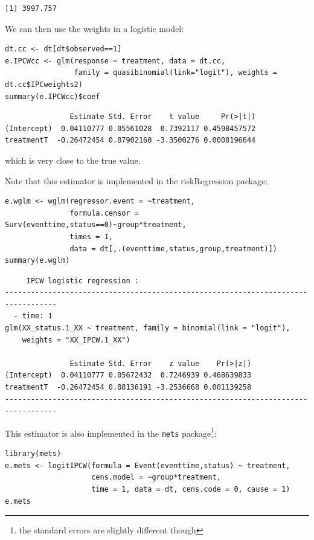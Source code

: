 \documentclass[12pt]{article}
\begin{document}
\begin{verbatim}
[1] 3997.757
\end{verbatim}


We can then use the weights in a logistic model:
\lstset{language=r,label= ,caption= ,captionpos=b,numbers=none}
\begin{lstlisting}
dt.cc <- dt[dt$observed==1]
e.IPCWcc <- glm(response ~ treatment, data = dt.cc,
                family = quasibinomial(link="logit"), weights = dt.cc$IPCweights2)
summary(e.IPCWcc)$coef
\end{lstlisting}

\begin{verbatim}
               Estimate Std. Error    t value     Pr(>|t|)
(Intercept)  0.04110777 0.05561028  0.7392117 0.4598457572
treatmentT  -0.26472454 0.07902160 -3.3500276 0.0008196644
\end{verbatim}


which is very close to the true value.

\clearpage

Note that this estimator is implemented in the riskRegression package:
\lstset{language=r,label= ,caption= ,captionpos=b,numbers=none}
\begin{lstlisting}
e.wglm <- wglm(regressor.event = ~treatment,
               formula.censor = Surv(eventtime,status==0)~group*treatment,
               times = 1, 
               data = dt[,.(eventtime,status,group,treatment)])
summary(e.wglm)
\end{lstlisting}

\begin{verbatim}
     IPCW logistic regression : 
----------------------------------------------------------------------------------
  - time: 1
glm(XX_status.1_XX ~ treatment, family = binomial(link = "logit"), 
    weights = "XX_IPCW.1_XX")

               Estimate Std. Error    z value    Pr(>|z|)
(Intercept)  0.04110777 0.05672432  0.7246939 0.468639833
treatmentT  -0.26472454 0.08136191 -3.2536668 0.001139258
----------------------------------------------------------------------------------
\end{verbatim}

This estimator is also implemented in the \texttt{mets} package\footnote{the standard errors are slightly different though}:
\lstset{language=r,label= ,caption= ,captionpos=b,numbers=none}
\begin{lstlisting}
library(mets)
e.mets <- logitIPCW(formula = Event(eventtime,status) ~ treatment,
                    cens.model = ~group*treatment,
                    time = 1, data = dt, cens.code = 0, cause = 1)
e.mets
\end{lstlisting}
\end{document}
